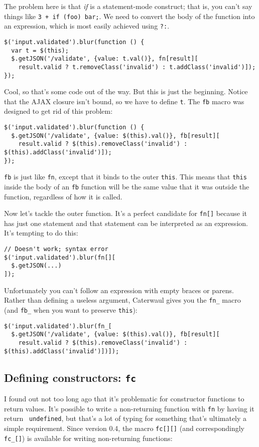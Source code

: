 \documentclass{report}
\begin{document}
    The problem here is that {\em if} is a statement-mode construct; that is, you can't say things like {\tt 3 + if (foo) bar;}. We need to convert the body of the function into an expression,
    which is most easily achieved using {\tt ?:}.

\begin{verbatim}
$('input.validated').blur(function () {
  var t = $(this);
  $.getJSON('/validate', {value: t.val()}, fn[result][
    result.valid ? t.removeClass('invalid') : t.addClass('invalid')]);
});
\end{verbatim}

    Cool, so that's some code out of the way. But this is just the beginning. Notice that the AJAX closure isn't bound, so we have to define {\tt t}. The {\tt fb} macro was designed to get rid
    of this problem:

\begin{verbatim}
$('input.validated').blur(function () {
  $.getJSON('/validate', {value: $(this).val()}, fb[result][
    result.valid ? $(this).removeClass('invalid') : $(this).addClass('invalid')]);
});
\end{verbatim}

    {\tt fb} is just like {\tt fn}, except that it binds to the outer {\tt this}. This means that {\tt this} inside the body of an {\tt fb} function will be the same value that it was outside
    the function, regardless of how it is called.

    Now let's tackle the outer function. It's a perfect candidate for {\tt fn[]} because it has just one statement and that statement can be interpreted as an expression. It's tempting to do
    this:

\begin{verbatim}
// Doesn't work; syntax error
$('input.validated').blur(fn[][
  $.getJSON(...)
]);
\end{verbatim}

    Unfortunately you can't follow an expression with empty braces or parens. Rather than defining a useless argument, Caterwaul gives you the \verb|fn_| macro (and \verb|fb_| when you want to
    preserve {\tt this}):

\begin{verbatim}
$('input.validated').blur(fn_[
  $.getJSON('/validate', {value: $(this).val()}, fb[result][
    result.valid ? $(this).removeClass('invalid') : $(this).addClass('invalid')])]);
\end{verbatim}

\subsection{Defining constructors: {\tt fc}}
      I found out not too long ago that it's problematic for constructor functions to return values. It's possible to write a non-returning function with {\tt fn} by having it return {\tt
      undefined}, but that's a lot of typing for something that's ultimately a simple requirement. Since version 0.4, the macro {\tt fc[][]} (and correspondingly \verb|fc_[]|) is available for
      writing non-returning functions:
\end{document}
